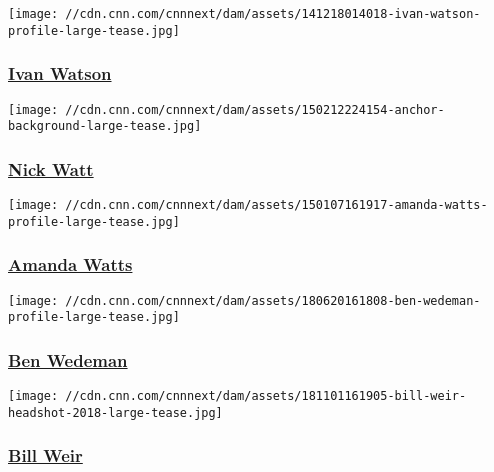 \href{/profiles/ivan-watson}{}

\texttt{[image: //cdn.cnn.com/cnnnext/dam/assets/141218014018-ivan-watson-profile-large-tease.jpg]}

\hypertarget{ivan-watson}{%
\subsubsection{\texorpdfstring{\href{/profiles/ivan-watson}{Ivan
Watson}}{Ivan Watson}}\label{ivan-watson}}

\href{/profiles/nick-watt}{}

\texttt{[image: //cdn.cnn.com/cnnnext/dam/assets/150212224154-anchor-background-large-tease.jpg]}

\hypertarget{nick-watt}{%
\subsubsection{\texorpdfstring{\href{/profiles/nick-watt}{Nick
Watt}}{Nick Watt}}\label{nick-watt}}

\href{/profiles/amanda-watts}{}

\texttt{[image: //cdn.cnn.com/cnnnext/dam/assets/150107161917-amanda-watts-profile-large-tease.jpg]}

\hypertarget{amanda-watts}{%
\subsubsection{\texorpdfstring{\href{/profiles/amanda-watts}{Amanda
Watts}}{Amanda Watts}}\label{amanda-watts}}

\href{/profiles/ben-wedeman-profile}{}

\texttt{[image: //cdn.cnn.com/cnnnext/dam/assets/180620161808-ben-wedeman-profile-large-tease.jpg]}

\hypertarget{ben-wedeman}{%
\subsubsection{\texorpdfstring{\href{/profiles/ben-wedeman-profile}{Ben
Wedeman}}{Ben Wedeman}}\label{ben-wedeman}}

\href{/profiles/bill-weir-profile}{}

\texttt{[image: //cdn.cnn.com/cnnnext/dam/assets/181101161905-bill-weir-headshot-2018-large-tease.jpg]}

\hypertarget{bill-weir}{%
\subsubsection{\texorpdfstring{\href{/profiles/bill-weir-profile}{Bill
Weir}}{Bill Weir}}\label{bill-weir}}

